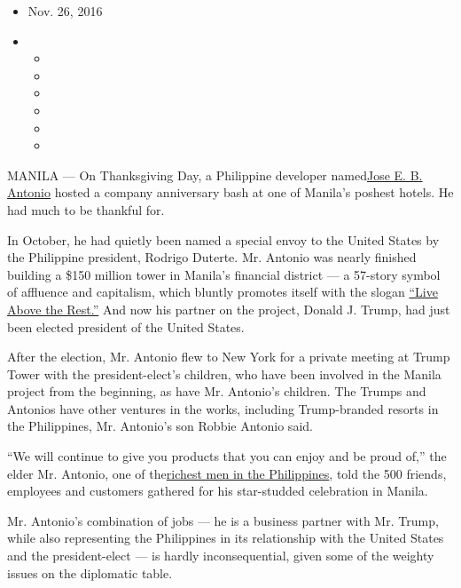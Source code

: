 \begin{itemize}
\item
  Nov. 26, 2016
\item
  \begin{itemize}
  \item
  \item
  \item
  \item
  \item
  \item
  \end{itemize}
\end{itemize}

MANILA --- On Thanksgiving Day, a Philippine developer
named\href{http://www.nytimes.com/2016/11/10/world/asia/donald-trump-philippines-jose-antonio.html?_r=0}{Jose
E. B. Antonio} hosted a company anniversary bash at one of Manila's
poshest hotels. He had much to be thankful for.

In October, he had quietly been named a special envoy to the United
States by the Philippine president, Rodrigo Duterte. Mr. Antonio was
nearly finished building a \$150 million tower in Manila's financial
district --- a 57-story symbol of affluence and capitalism, which
bluntly promotes itself with the slogan
\href{https://www.facebook.com/pg/trumptowercenturycity/photos/?tab=album\&album_id=1317830394933885}{``Live
Above the Rest.''} And now his partner on the project, Donald J. Trump,
had just been elected president of the United States.

After the election, Mr. Antonio flew to New York for a private meeting
at Trump Tower with the president-elect's children, who have been
involved in the Manila project from the beginning, as have Mr. Antonio's
children. The Trumps and Antonios have other ventures in the works,
including Trump-branded resorts in the Philippines, Mr. Antonio's son
Robbie Antonio said.

``We will continue to give you products that you can enjoy and be proud
of,'' the elder Mr. Antonio, one of
the\href{http://www.forbes.com/profile/jose-antonio/}{richest men in the
Philippines}, told the 500 friends, employees and customers gathered for
his star-studded celebration in Manila.

Mr. Antonio's combination of jobs --- he is a business partner with Mr.
Trump, while also representing the Philippines in its relationship with
the United States and the president-elect --- is hardly inconsequential,
given some of the weighty issues on the diplomatic table.

